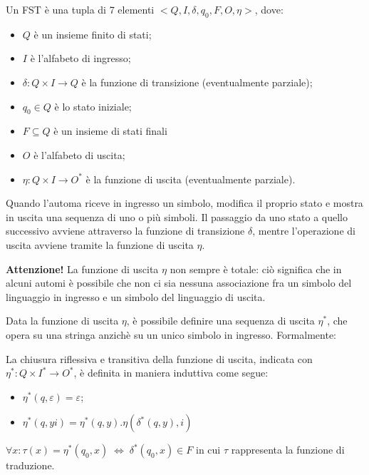     \begin{definition}
      Un FST è una tupla di 7 elementi \(<Q, I, \delta, q_0, F, O, \eta>\), dove:
      \begin{itemize}
        \item \(Q\) è un insieme finito di stati;
        \item \(I\) è l'alfabeto di ingresso;
        \item \(\delta:Q\times I\to Q\) è la funzione di transizione (eventualmente parziale);
        \item \(q_0\in Q\) è lo stato iniziale;
        \item \(F\subseteq Q\) è un insieme di stati finali
        \item \(O\) è l'alfabeto di uscita;
        \item \(\eta:Q\times I \to O^*\) è la funzione di uscita (eventualmente parziale).
      \end{itemize}
    \end{definition}
    Quando l'automa riceve in ingresso un simbolo, modifica il proprio stato  e mostra in uscita una sequenza di uno o più simboli. Il passaggio da uno stato a quello successivo avviene attraverso la funzione di transizione \(\delta\), mentre l'operazione di uscita avviene tramite la funzione di uscita \(\eta\). 

    \textbf{Attenzione!} La funzione di uscita \(\eta\) non sempre è totale: ciò significa che in alcuni automi è possibile che non ci sia nessuna associazione fra un simbolo del linguaggio in ingresso e un simbolo del linguaggio di uscita.

    Data la funzione di uscita \(\eta\), è possibile definire una sequenza di uscita \(\eta^*\), che opera su una stringa anzichè su un unico simbolo in ingresso. Formalmente:

    \begin{definition}
      La chiusura riflessiva e transitiva della funzione di uscita, indicata con \(\eta^*:Q\times I^* \to O^*\), è definita in maniera induttiva come segue:
      \begin{itemize}
        \item \(\eta^*(q, \varepsilon) = \varepsilon\);
        \item \(\eta^*(q, yi) = \eta^*(q, y).\eta(\delta^*(q,y),i)\)
      \end{itemize}
      \(\forall x : \tau(x)=\eta^*(q_0,x)\; \Leftrightarrow \; \delta^*(q_0,x) \in F\) in cui \(\tau\) rappresenta la funzione di traduzione.
    \end{definition}

